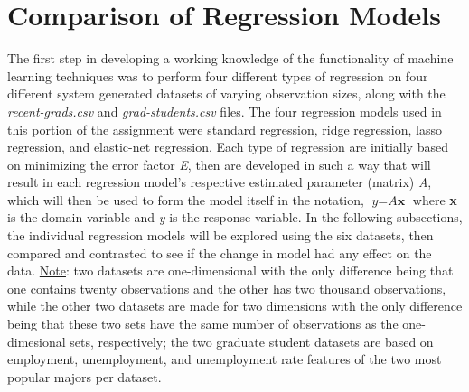 \documentclass[a4paper,12pt]{IEEEtran}
\begin{document}
\section{Comparison of Regression Models}
The first step in developing a working knowledge of the functionality of machine learning techniques was to perform four different types of regression on four different system generated datasets of varying observation sizes, along with the \textit{recent-grads.csv} and \textit{grad-students.csv} files. The four regression models used in this portion of the assignment were standard regression, ridge regression, lasso regression, and elastic-net regression. Each type of regression are initially based on minimizing the error factor \textit{E}, then are developed in such a way that will result in each regression model's respective estimated parameter (matrix) \textit{A}, which will then be used to form the model itself in the notation, \(\textit{y} = \textit{A}\textbf{x}\) where \textbf{x} is the domain variable and \textit{y} is the response variable. In the following subsections, the individual regression models will be explored using the six datasets, then compared and contrasted to see if the change in model had any effect on the data. \underline{Note}: two datasets are one-dimensional with the only difference being that one contains twenty observations and the other has two thousand observations, while the other two datasets are made for two dimensions with the only difference being that these two sets have the same number of observations as the one-dimesional sets, respectively; the two graduate student datasets are based on employment, unemployment, and unemployment rate features of the two most popular majors per dataset.
\end{document}
